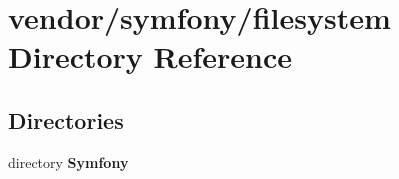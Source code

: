 \section{vendor/symfony/filesystem Directory Reference}
\label{dir_98ef08ed6abc1146d67ef6131ed049e3}
\subsection*{Directories}
\begin{DoxyCompactItemize}
\item 
directory {\bf Symfony}
\end{DoxyCompactItemize}
